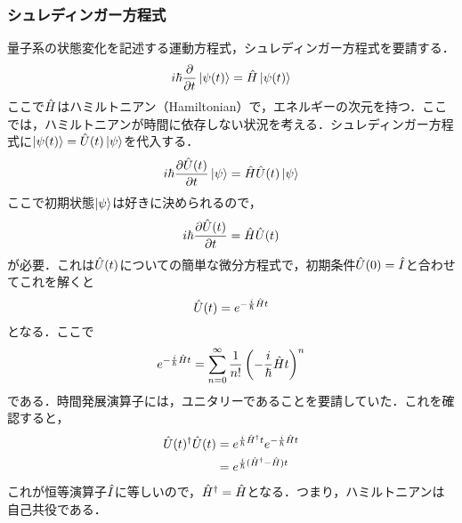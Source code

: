 \documentclass[a4paper,10pt,uplatex]{jsarticle}
\begin{document}
\subsubsection{シュレディンガー方程式}
量子系の状態変化を記述する運動方程式，シュレディンガー方程式を要請する．
\begin{equation}
    i\hbar\pdv{t}\ket{\psi(t)} = \hat{H}\ket{\psi(t)}
\end{equation}
ここで$\hat{H}$はハミルトニアン（Hamiltonian）で，エネルギーの次元を持つ．ここでは，ハミルトニアンが時間に依存しない状況を考える．シュレディンガー方程式に$\ket{\psi(t)} = \hat{U}(t)\ket{\psi}$を代入する．
\begin{equation}
    i\hbar\pdv{\hat{U}(t)}{t}\ket{\psi} = \hat{H}\hat{U}(t)\ket{\psi}
\end{equation}
ここで初期状態$\ket{\psi}$は好きに決められるので，
\begin{equation}
    i\hbar\pdv{\hat{U}(t)}{t} = \hat{H}\hat{U}(t)
\end{equation}
が必要．これは$\hat{U}(t)$についての簡単な微分方程式で，初期条件$\hat{U}(0)=\hat{I}$と合わせてこれを解くと
\begin{equation}
    \hat{U}(t) = e^{-\frac{i}{\hbar}\hat{H} t}
\end{equation}
となる．ここで
\begin{equation}
    e^{-\frac{i}{\hbar}\hat{H} t} = \sum_{n=0}^\infty \frac{1}{n!} \left(-\frac{i}{\hbar}\hat{H} t\right)^n
\end{equation}
である．時間発展演算子には，ユニタリーであることを要請していた．これを確認すると，
\begin{align}
    \hat{U}(t)^\dagger \hat{U}(t) &= e^{\frac{i}{\hbar}\hat{H}^\dagger t}e^{-\frac{i}{\hbar}\hat{H} t}\\
    &= e^{\frac{i}{\hbar}(\hat{H}^\dagger - \hat{H})t}
\end{align}
これが恒等演算子$\hat{I}$に等しいので，$\hat{H}^\dagger = \hat{H}$となる．つまり，ハミルトニアンは自己共役である．
\end{document}
